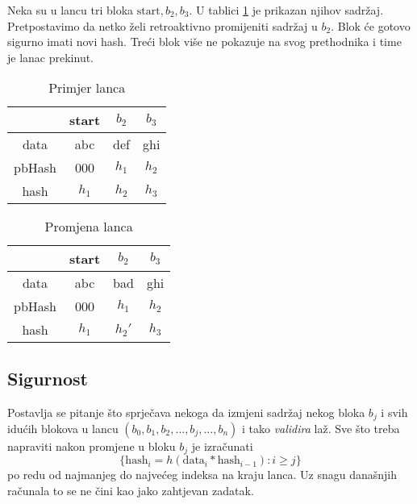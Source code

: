 \documentclass[12pt]{scrartcl} %
\newcommand{\tt}[1]{
\text{#1}
}
\newcommand{\red}[1]{
\color{red} #1 \color{black}
}
\begin{document}
\begin{primjer}\label{primjer:lanac}

Neka su u lancu tri bloka $\tt{start}, b_2, b_3$. U tablici \ref{tab:e1} je prikazan njihov sadržaj. Pretpostavimo da netko želi retroaktivno promijeniti sadržaj u $b_2$. Blok će gotovo sigurno imati novi hash. Treći blok više ne pokazuje na svog prethodnika i time je lanac prekinut.

\begin{table}[ht]
    \centering
    \begin{tabular}{|c|c|c|c|}
        \hline
        & start & $b_2$ & $b_3$ \\
        \hline
        data & abc & def & ghi \\
        \hline 
        pbHash & 000 & $h_1$ & $h_2$ \\
        \hline
        hash & $h_1$ & $h_2$ & $h_3$ \\
        \hline
    \end{tabular}
    \caption{Primjer lanca}
    \label{tab:e1}
\end{table}

\begin{table}[ht]
    \centering
    \begin{tabular}{|c|c|c|c|}
    \hline
        & start & $b_2$ & $b_3$ \\
        \hline
        data & abc & \red{bad} & ghi \\
        \hline 
        pbHash & 000 & $h_1$ & $h_2$ \\
        \hline
        hash & $h_1$ & \red{$h_2'$} & $h_3$ \\
    \hline
    \end{tabular}
    \caption{Promjena lanca}
    \label{tab:e1-promjena}
\end{table}

\FloatBarrier
\end{primjer}

\subsection{Sigurnost} \label{sub:sig}
Postavlja se pitanje što sprječava nekoga da izmjeni sadržaj nekog bloka $b_j$ i svih idućih blokova u lancu $(b_0, b_1, b_2, \dots, b_j, \dots, b_n)$ i tako \emph{validira} laž. Sve što treba napraviti nakon promjene u bloku $b_j$ je izračunati 
\[ \{\tt{hash}_i = h(\tt{data}_i * \tt{hash}_{i-1}) : i \geq j\} \] po redu od najmanjeg do najvećeg indeksa na kraju lanca. Uz snagu današnjih računala to se ne čini kao jako zahtjevan zadatak.
\end{document}
